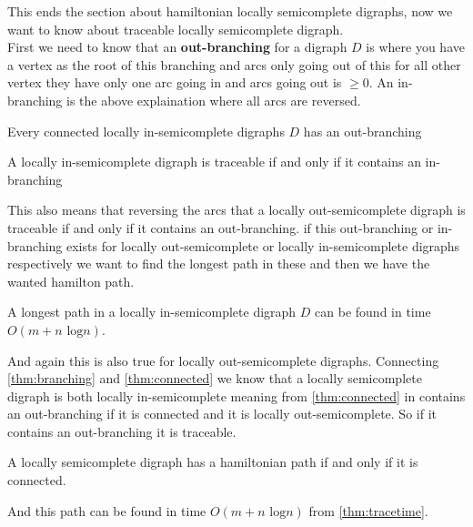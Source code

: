 This ends the section about hamiltonian locally semicomplete digraphs, now we want to know about traceable locally semicomplete digraph. \\
First we need to know that an \textbf{out-branching} for a digraph $D$ is where you have a vertex as the root of this branching and arcs only going out of this for all other vertex they have only one arc going in and arcs going out is $\geq 0$. 
An in-branching is the above explaination where all arcs are reversed.
\begin{thm}
    Every connected locally in-semicomplete digraphs $D$ has an out-branching
    \label{thm:connected}
\end{thm}
\begin{thm}
    A locally in-semicomplete digraph is traceable if and only if it contains an in-branching
    \label{thm:branching}
\end{thm}
This also means that reversing the arcs that a locally out-semicomplete digraph is traceable if and only if it contains an out-branching. 
if this out-branching or in-branching exists for locally out-semicomplete or locally in-semicomplete digraphs respectively we want to find the longest path in these and then we have the wanted hamilton path.
\begin{thm}
    A longest path in a locally in-semicomplete digraph $D$ can be found in time $O(m+n\text{ log}n)$. 
    \label{thm:tracetime}
\end{thm}
And again this is also true for locally out-semicomplete digraphs.
Connecting \autoref{thm:branching} and \autoref{thm:connected} we know that a locally semicomplete digraph is both locally in-semicomplete meaning from \autoref{thm:connected} in contains an out-branching if it is connected and it is locally out-semicomplete. So if it contains an out-branching it is traceable. 
\begin{thm}
    A locally semicomplete digraph has a hamiltonian path if and only if it is connected.
\end{thm}
And this path can be found in time $O(m+n\text{ log}n)$ from \autoref{thm:tracetime}.



